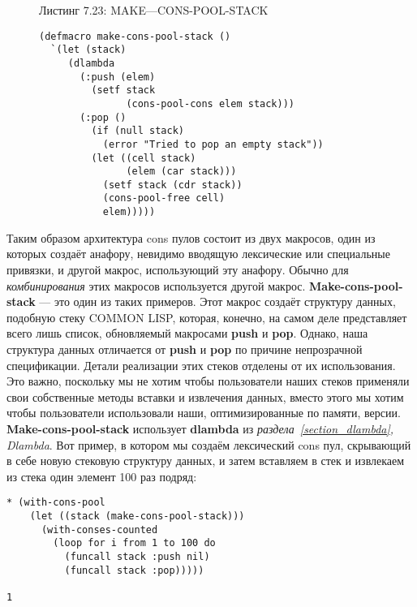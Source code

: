 \begin{figure}Листинг 7.23: MAKE—CONS-POOL-STACK\label{listing_7.23}
\listbegin
\begin{verbatim}
(defmacro make-cons-pool-stack ()
  `(let (stack)
     (dlambda
       (:push (elem)
         (setf stack
               (cons-pool-cons elem stack)))
       (:pop ()
         (if (null stack)
           (error "Tried to pop an empty stack"))
         (let ((cell stack)
               (elem (car stack)))
           (setf stack (cdr stack))
           (cons-pool-free cell)
           elem)))))
\end{verbatim}
\listend
\end{figure}

Таким образом архитектура cons пулов состоит из двух макросов, один из которых создаёт анафору, невидимо вводящую лексические или специальные привязки, и другой макрос, использующий эту анафору. Обычно для \emph{комбинирования} этих макросов используется другой макрос. \textbf{Make-cons-pool-stack} --- это один из таких примеров. Этот макрос создаёт структуру данных, подобную стеку COMMON LISP, которая, конечно, на самом деле представляет всего лишь список, обновляемый макросами \textbf{push} и \textbf{pop}. Однако, наша структура данных отличается от \textbf{push} и \textbf{pop} по причине непрозрачной спецификации. Детали реализации этих стеков отделены от их использования. Это важно, поскольку мы не хотим чтобы пользователи наших стеков применяли свои собственные методы вставки и извлечения данных, вместо этого мы хотим чтобы пользователи использовали наши, оптимизированные по памяти, версии. \textbf{Make-cons-pool-stack} использует \textbf{dlambda} из \emph{раздела~\ref{section_dlambda}, Dlambda}. Вот пример, в котором мы создаём лексический cons пул, скрывающий в себе новую стековую структуру данных, и затем вставляем в стек и извлекаем из стека один элемент 100 раз подряд:

\begin{verbatim}
* (with-cons-pool
    (let ((stack (make-cons-pool-stack)))
      (with-conses-counted
        (loop for i from 1 to 100 do
          (funcall stack :push nil)
          (funcall stack :pop)))))

1
\end{verbatim}

